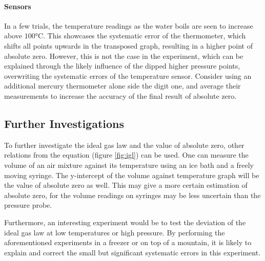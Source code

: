 \documentclass[a4paper,12pt]{article}
\begin{document}
\paragraph{Sensors}
In a few trials, the temperature readings as the water boils are seen to increase above $100\si{\celsius}$. This showcases the systematic error of the thermometer, which shifts all points upwards in the transposed graph, resulting in a higher point of absolute zero. However, this is not the case in the experiment, which can be explained through the likely influence of the dipped higher pressure points, overwriting the systematic errors of the temperature sensor. Consider using an additional mercury thermometer alone side the digit one, and average their measurements to increase the accuracy of the final result of absolute zero.

\subsection{Further Investigations}
To further investigate the ideal gas law and the value of absolute zero, other relations from the equation (figure \ref{fig:igl}) can be used. One can measure the volume of an air mixture against its temperature using an ice bath and a freely moving syringe. The y-intercept of the volume against temperature graph will be the value of absolute zero as well. This may give a more certain estimation of absolute zero, for the volume readings on syringes may be less uncertain than the pressure probe.

Furthermore, an interesting experiment would be to test the deviation of the ideal gas law at low temperatures or high pressure. By performing the aforementioned experiments in a freezer or on top of a mountain, it is likely to explain and correct the small but significant systematic errors in this experiment.

\printbibliography


\newpage
\end{document}
